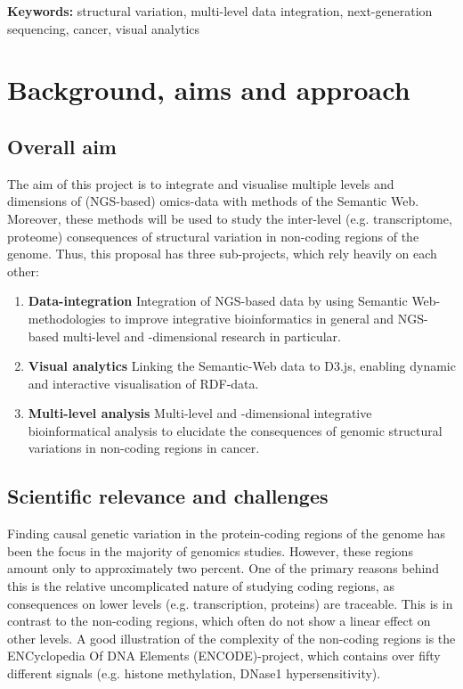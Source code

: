 \documentclass[twoside,fontsize=12pt]{article}
\begin{document}
\noindent \textbf{Keywords:} structural variation, multi-level data integration, next-generation sequencing, cancer, visual analytics

\newpage
\section*{Background, aims and approach}
\subsection*{Overall aim}
The aim of this project is to integrate and visualise multiple levels and dimensions of (NGS-based) omics-data with methods of the Semantic Web. Moreover, these methods will be used to study the inter-level (e.g. transcriptome, proteome) consequences of structural variation in non-coding regions of the genome. Thus, this proposal has three sub-projects, which rely heavily on each other:

\begin{enumerate}
\item \textbf{Data-integration} 
Integration of NGS-based data by using Semantic Web-methodologies to improve integrative bioinformatics in general and NGS-based multi-level and -dimensional research in particular.
\item \textbf{Visual analytics} 
Linking the Semantic-Web data to D3.js, enabling dynamic and interactive visualisation of RDF-data.
\item \textbf{Multi-level analysis} 
Multi-level and -dimensional integrative bioinformatical analysis to elucidate the consequences of genomic structural variations in non-coding regions in cancer.
\end{enumerate}
\subsection*{Scientific relevance and challenges} 
Finding causal genetic variation in the protein-coding regions of the genome has been the focus in the majority of genomics studies. However, these regions amount only to approximately two percent\cite{Lander2001}. One of the primary reasons behind this is the relative uncomplicated nature of studying coding regions, as consequences on lower levels (e.g. transcription, proteins) are traceable\cite{McLaren2010}. This is in contrast to the non-coding regions, which often do not show a linear effect on other levels\cite{Bird2006}. A good illustration of the complexity of the non-coding regions is the ENCyclopedia Of DNA Elements (ENCODE)-project\cite{ENCODE}, which contains over fifty different signals (e.g. histone methylation, DNase1 hypersensitivity). 
\end{document}
